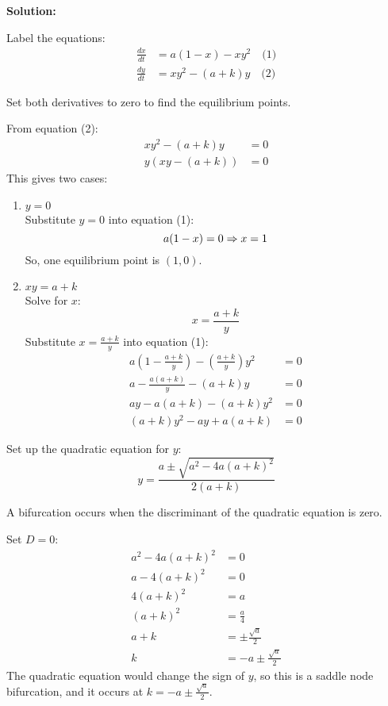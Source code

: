 \documentclass[12pt]{article}
\newenvironment{solution}{
    \textbf{Solution:}
    
}{
    
    \vspace{2em}
}
\begin{document}
\begin{solution}
    Label the equations:
    \[
    \begin{aligned}
        \frac{dx}{dt} &= a(1 - x) - x y^2 \quad \text{(1)} \\
        \frac{dy}{dt} &= x y^2 - (a + k) y \quad \text{(2)}
    \end{aligned}
    \]
    
    Set both derivatives to zero to find the equilibrium points.
    
    From equation (2):
    \[
        \begin{aligned}
            x y^2 - (a + k) y &= 0\\
            y (x y - (a + k)) &= 0
        \end{aligned}
    \]
    This gives two cases:
    \begin{enumerate}
        \item \( y = 0 \) \\
        Substitute \( y = 0 \) into equation (1):
        \[
        a(1 - x) = 0 \\
        \Rightarrow x = 1
        \]
        So, one equilibrium point is \( (1, 0) \).
        
        \item \( x y = a + k \) \\
        Solve for \( x \):
        \[
        x = \frac{a + k}{y}
        \]
        Substitute \( x = \frac{a + k}{y} \) into equation (1):
        \[
        \begin{aligned}
            a\left(1 - \frac{a + k}{y}\right) - \left(\frac{a + k}{y}\right) y^2 &= 0 \\
            a - \frac{a(a + k)}{y} - (a + k) y &= 0 \\
            a y - a(a + k) - (a + k) y^2 &= 0 \\
            (a + k) y^2 - a y + a(a + k) &= 0
        \end{aligned}
        \]
    \end{enumerate}
    Set up the quadratic equation for \( y \):
    \[
        y = \frac{a \pm \sqrt{a^2 - 4a(a + k)^2}}{2(a + k)}
    \]

    A bifurcation occurs when the discriminant of the quadratic equation is zero.
    
    Set \( D = 0 \):
    \[
        \begin{aligned}
            a^2 - 4a(a + k)^2 &= 0 \\
            a - 4(a + k)^2 &= 0 \\
            4(a + k)^2 &= a \\
            (a + k)^2 &= \frac{a}{4} \\
            a + k &= \pm \frac{\sqrt{a}}{2} \\
            k &= -a \pm \frac{\sqrt{a}}{2}
        \end{aligned}
    \]
    The quadratic equation would change the sign of \(y\), so this is a saddle node bifurcation, and it occurs at \(k = -a \pm \frac{\sqrt{a}}{2}\).
\end{solution}
\end{document}
